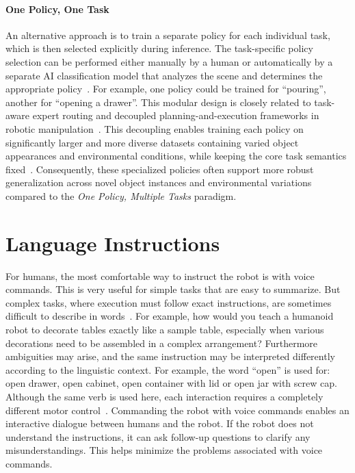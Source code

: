 \paragraph{One Policy, One Task}
An alternative approach is to train a separate policy for each individual task, which is then selected explicitly during inference. 
The task-specific policy selection can be performed either manually by a human or automatically by a separate \ac{AI} classification model that analyzes the scene and determines the appropriate policy~\cite{chen_RoboRouterTrainingFreePolicy_2026}. For example, one policy could be trained for ``pouring'', another for ``opening a drawer''. This modular design is closely related to task-aware expert routing and decoupled planning-and-execution frameworks in robotic manipulation~\cite{chen_RoboRouterTrainingFreePolicy_2026}.
This decoupling enables training each policy on significantly larger and more diverse datasets containing varied object appearances and environmental conditions, while keeping the core task semantics fixed~\cite{raffin_DECOUPLINGFEATUREEXTRACTION_2019}. Consequently, these specialized policies often support more robust generalization across novel object instances and environmental variations compared to the \textit{One Policy, Multiple Tasks} paradigm.~\cite{bai_LearningSeeAct_2025, _MultitaskRobotManipulation_a, tamar_IMITATIONLEARNINGVISUAL_2018}





\section{Language Instructions}

For humans, the most comfortable way to instruct the robot is with voice commands. This is very useful for simple tasks that are easy to summarize. But complex tasks, where execution must follow exact instructions, are sometimes difficult to describe in words~\cite{Jain2024Vid2RobotEV}. For example, how would you teach a humanoid robot to decorate tables exactly like a sample table, especially when various decorations need to be assembled in a complex arrangement?
Furthermore ambiguities may arise, and the same instruction may be interpreted differently according to the linguistic context. For example, the word ``open'' is used for: open drawer, open cabinet, open container with lid or open jar with screw cap. Although the same verb is used here, each interaction requires a completely different motor control~\cite{Jain2024Vid2RobotEV}.
Commanding the robot with voice commands enables an interactive dialogue between humans and the robot. If the robot does not understand the instructions, it can ask follow-up questions to clarify any misunderstandings. This helps minimize the problems associated with voice commands.



